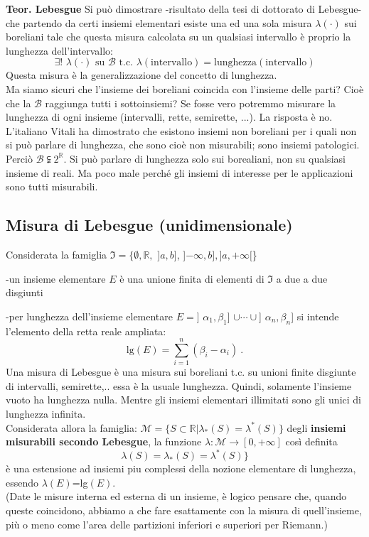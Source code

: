 \documentclass[a4paper,11pt]{article}
\theoremstyle{plain}
\theoremstyle{definition}
\theoremstyle{remark}
\begin{document}
\textbf{Teor. Lebesgue} Si può dimostrare -risultato della tesi di dottorato di Lebesgue- che partendo da certi insiemi elementari esiste una ed una sola misura $\lambda(\cdot)$ sui boreliani tale che questa misura calcolata su un qualsiasi intervallo è proprio la lunghezza dell'intervallo:
$$
\exists! \,\, \lambda(\cdot) \mathrm{\,\, su \,\,} \mathcal{B} \mathrm{\,\, t.c. \,\,} \lambda(\mathrm{intervallo})=\mathrm{lunghezza (intervallo)}
$$
Questa misura è la generalizzazione del concetto di lunghezza.\\
Ma siamo sicuri che l'insieme dei boreliani coincida con l'insieme delle parti? Cioè che la $\mathcal{B}$ raggiunga tutti i sottoinsiemi?
Se fosse vero potremmo misurare la lunghezza di ogni insieme (intervalli, rette, semirette, ...). La risposta è no.
L'italiano Vitali ha dimostrato che esistono insiemi non boreliani per i quali non si può parlare di lunghezza, che sono cioè non misurabili; sono insiemi patologici. Perciò $\mathcal{B} \subsetneqq 2^\mathbb{R}$. Si può parlare di lunghezza solo sui borealiani, non su qualsiasi insieme di reali. Ma poco male perché gli insiemi di interesse per le applicazioni sono tutti misurabili.

\subsection{Misura di Lebesgue (unidimensionale)}

Considerata la famiglia $\Im=\{\emptyset, \mathbb{R},$ ]$a, b$], ]$-\infty, b], ]a, +\infty[$\}

-un insieme elementare $E$ è una unione finita di elementi di $\Im$ a due a due disgiunti

-per lunghezza dell'insieme elementare $E=$] $\alpha_{1}, \beta_{1}$] $\cup\cdots\cup$] $\alpha_{n}, \beta_{n}$] si intende l'elemento della retta reale ampliata:
$$
\mathrm{l}\mathrm{g}(E)=\sum_{i=1}^{n}(\beta_{i}-\alpha_{i})\ .
$$
Una misura di Lebesgue è una misura sui boreliani t.c. su unioni finite disgiunte di intervalli, semirette,.. essa è la usuale lunghezza. Quindi, solamente l'insieme vuoto ha lunghezza nulla. Mentre gli insiemi elementari illimitati sono gli unici di lunghezza infinita.\\

Considerata allora la famiglia:
$\mathcal{M} = \{S \subset \mathbb{R}| \lambda_{*}(S)=\lambda^{*}(S)\}$ degli \textbf{insiemi misurabili secondo Lebesgue}, la funzione $\lambda: \mathcal{M} \rightarrow [0,+\infty]$ così definita 
$$ 
\lambda(S)=\lambda_{*}(S)=\lambda^{*}(S)\}
$$ è una estensione ad insiemi piu complessi della nozione elementare di lunghezza, essendo $\lambda(E)$=lg$(E)$.  \\
(Date le misure interna ed esterna di un insieme, è logico pensare che, quando queste coincidono, abbiamo a che fare esattamente con la misura di quell'insieme, più o meno come l'area delle partizioni inferiori e superiori per Riemann.)\\
\end{document}
